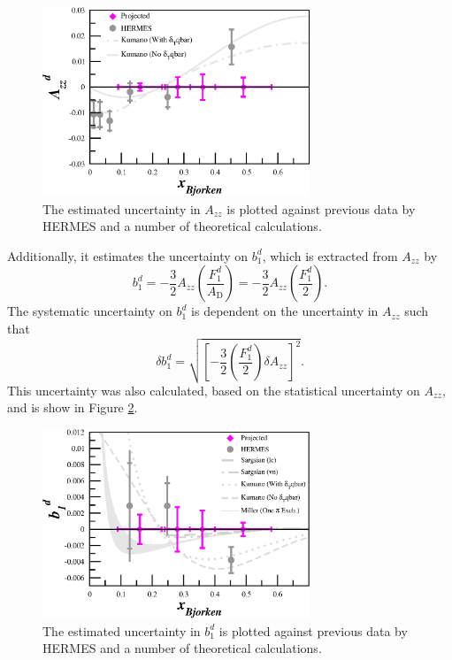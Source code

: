 \documentclass[11pt]{article}
\begin{document}
\begin{figure}
	\begin{center}
	\includegraphics[width=8cm]{hms_shms_Azz.eps}
	\end{center}
	\caption [Uncertainty in $A_{zz}$] {The estimated uncertainty in $A_{zz}$ is plotted against previous data by HERMES and a number of theoretical calculations.}
	\label{fig-dAzz}
\end{figure}


Additionally, it estimates the uncertainty on $b_1^d$, which is extracted from $A_{zz}$ by
\begin{equation}
b_1^d = - \frac{3}{2}A_{zz} \left( \frac{F_1^d}{A_{\mathrm{D}}} \right)= - \frac{3}{2}A_{zz} \left( \frac{F_1^d}{2} \right). 
\end{equation}
The systematic uncertainty on $b_1^d$ is dependent on the uncertainty in $A_{zz}$ such that 
\begin{equation}
\delta b_1^d =\sqrt{ \left[ - \frac{3}{2} \left( \frac{F_1^d}{2} \right)\delta A_{zz} \right]^2}.
\end{equation}
This uncertainty was also calculated, based on the statistical uncertainty on $A_{zz}$, and is show in Figure \ref{fig-db1}.

\begin{figure}
	\begin{center}
	\includegraphics[width=8cm]{hms_shms_b1.eps}
	\end{center}
	\caption [Uncertainty in $b_1^d$] {The estimated uncertainty in $b_1^d$ is plotted against previous data by HERMES and a number of theoretical calculations.}
	\label{fig-db1}
\end{figure}
\end{document}
